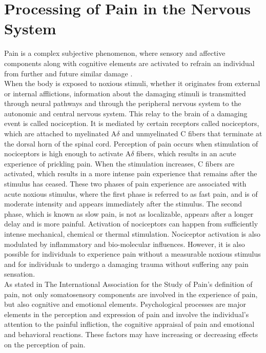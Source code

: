 \section{Processing of Pain in the Nervous System}

Pain is a complex subjective phenomenon, where sensory and affective components along with cognitive elements are activated to refrain an individual from further and future similar damage \cite{Davis2017}. \\
When the body is exposed to noxious stimuli, whether it originates from external or internal afflictions, information about the damaging stimuli is transmitted through neural pathways and through the peripheral nervous system to the autonomic and central nervous system. This relay to the brain of a damaging event is called nociception. It is mediated by certain receptors called nociceptors, which are attached to myelinated A$\delta$ and unmyelinated C fibers that terminate at the dorsal horn of the spinal cord. Perception of pain occurs when stimulation of nociceptors is high enough to activate A$\delta$ fibers, which results in an acute experience of prickling pain. When the stimulation increases, C fibers are activated, which results in a more intense pain experience that remains after the stimulus has ceased. These two phases of pain experience are associated with acute noxious stimulus, where the first phase is referred to as fast pain, and is of moderate intensity and appears immediately after the stimulus. The second phase, which is known as slow pain, is not as localizable, appears after a longer delay and is more painful. Activation of nociceptors can happen from sufficiently intense mechanical, chemical or thermal stimulation. Nociceptor activation is also modulated by inflammatory and bio-molecular influences. However, it is also possible for individuals to experience pain without a measurable noxious stimulus and for individuals to undergo a damaging trauma without suffering any pain sensation. \cite{Garland2013} \\ 
As stated in The International Association for the Study of Pain’s definition of pain, not only somatosensory components are involved in the experience of pain, but also cognitive and emotional elements. Psychological processes are major elements in the perception and expression of pain and involve the individual’s attention to the painful infliction, the cognitive appraisal of pain and emotional and behavioral reactions. These factors may have increasing or decreasing effects on the perception of pain. \\
